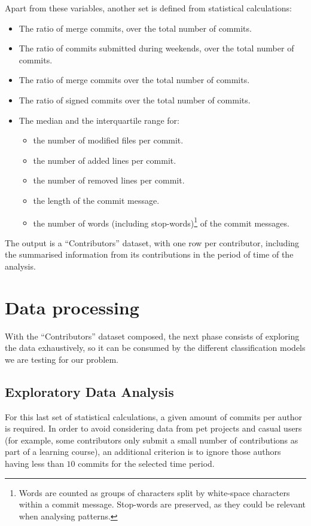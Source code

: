 \documentclass[a4paper, 12pt]{book}
\begin{document}
Apart from these variables, another set is defined from statistical calculations:
\begin{itemize}
\item The ratio of merge commits, over the total number of commits.
\item The ratio of commits submitted during weekends, over the total number of commits.
\item The ratio of merge commits over the total number of commits.
\item The ratio of signed commits over the total number of commits.
\item The median and the interquartile range for:
    \begin{itemize}
    \item the number of modified files per commit.
    \item the number of added lines per commit.
    \item the number of removed lines per commit.
    \item the length of the commit message.
    \item the number of words (including stop-words)\footnote{Words are counted as groups of characters split by white-space characters within a commit message. Stop-words are preserved, as they could be relevant when analysing patterns.} of the commit messages.
    \end{itemize}
\end{itemize}

The output is a ``Contributors'' dataset, with one row per contributor, including the summarised information from its contributions in the period of
time of the analysis.

\section{Data processing} 
\label{sec:data-processing}

With the ``Contributors'' dataset composed, the next phase consists of exploring the data exhaustively, so it can be consumed by the different classification models we are testing for our problem.

\subsection{Exploratory Data Analysis}
\label{ssec:eda}

For this last set of statistical calculations, a given amount of commits per author is required. In order to avoid considering data from pet projects and casual users (for example, some contributors only submit a small number of contributions as part of a learning course), an additional criterion is to ignore those authors having less than $10$ commits for the selected time period. 
\end{document}
